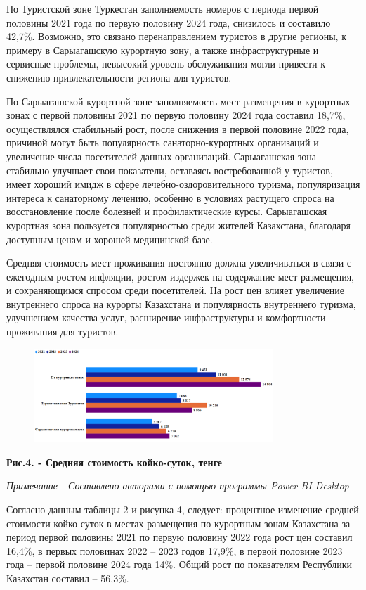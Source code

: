 По Туристской зоне Туркестан заполняемость номеров с периода первой
половины 2021 года по первую половину 2024 года, снизилось и составило
42,7\%. Возможно, это связано перенаправлением туристов в другие
регионы, к примеру в Сарыагашскую курортную зону, а также
инфраструктурные и сервисные проблемы, невысокий уровень обслуживания
могли привести к снижению привлекательности региона для туристов.

По Сарыагашской курортной зоне заполняемость мест размещения в курортных
зонах с первой половины 2021 по первую половину 2024 года составил
18,7\%, осуществлялся стабильный рост, после снижения в первой половине
2022 года, причиной могут быть популярность санаторно-курортных
организаций и увеличение числа посетителей данных организаций.
Сарыагашская зона стабильно улучшает свои показатели, оставаясь
востребованной у туристов, имеет хороший имидж в сфере
лечебно-оздоровительного туризма, популяризация интереса к санаторному
лечению, особенно в условиях растущего спроса на восстановление после
болезней и профилактические курсы. Сарыагашская курортная зона
пользуется популярностью среди жителей Казахстана, благодаря доступным
ценам и хорошей медицинской базе.

Средняя стоимость мест проживания постоянно должна увеличиваться в связи
с ежегодным ростом инфляции, ростом издержек на содержание мест
размещения, и сохраняющимся спросом среди посетителей. На рост цен
влияет увеличение внутреннего спроса на курорты Казахстана и
популярность внутреннего туризма, улучшением качества услуг, расширение
инфраструктуры и комфортности проживания для туристов.


\begin{figure}[H]
	\centering
	\includegraphics[width=0.8\textwidth]{media/ekon/image6}
	\caption*{}
\end{figure}


{\bfseries Рис.4. - Средняя стоимость койко-суток, тенге}

\emph{Примечание - Составлено авторами с помощью программы Power BI
Desktop}

Согласно данным таблицы 2 и рисунка 4, следует: процентное изменение
средней стоимости койко-суток в местах размещения по курортным зонам
Казахстана за период первой половины 2021 по первую половину 2022 года
рост цен составил 16,4\%, в первых половинах 2022 -- 2023 годов 17,9\%,
в первой половине 2023 года -- первой половине 2024 года 14\%. Общий
рост по показателям Республики Казахстан составил -- 56,3\%.

